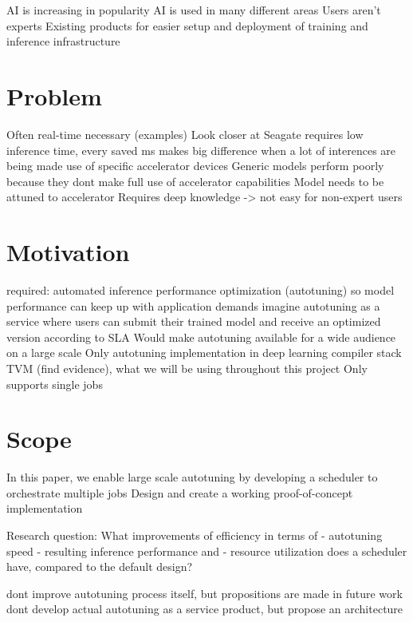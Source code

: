 AI is increasing in popularity
AI is used in many different areas
Users aren't experts
Existing products for easier setup and deployment of training and inference infrastructure

\section{Problem}
Often real-time necessary (examples)
Look closer at Seagate
requires low inference time, every saved ms makes big difference when a lot of interences are being made
use of specific accelerator devices
Generic models perform poorly because they dont make full use of accelerator capabilities
Model needs to be attuned to accelerator
Requires deep knowledge -> not easy for non-expert users

\section{Motivation}
required: automated inference performance optimization (autotuning) so model performance can keep up with application demands
imagine autotuning as a service where users can submit their trained model and receive an optimized version according to SLA
Would make autotuning available for a wide audience on a large scale
Only autotuning implementation in deep learning compiler stack TVM (find evidence), what we will be using throughout this project
Only supports single jobs

\section{Scope}
In this paper, we enable large scale autotuning by developing a scheduler to orchestrate multiple jobs
Design and create a working proof-of-concept implementation

Research question:
What improvements of efficiency in terms of
- autotuning speed
- resulting inference performance and 
- resource utilization
does a scheduler have, compared to the default design?

dont improve autotuning process itself, but propositions are made in future work
dont develop actual autotuning as a service product, but propose an architecture